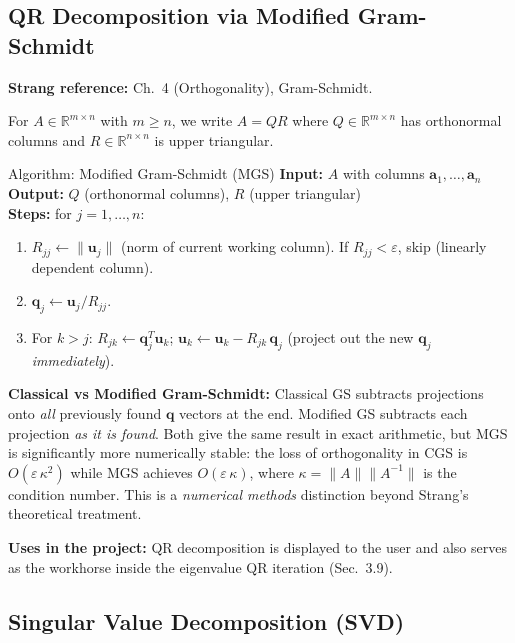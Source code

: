 \documentclass[12pt, a4paper]{article}
\newcommand{\R}{\mathbb{R}}
\begin{document}
\subsection{QR Decomposition via Modified Gram-Schmidt}

\textbf{Strang reference:} Ch.\ 4 (Orthogonality), Gram-Schmidt.

For $A \in \R^{m \times n}$ with $m \geq n$, we write $A = QR$ where
$Q \in \R^{m \times n}$ has orthonormal columns and $R \in \R^{n \times n}$
is upper triangular.

\begin{algobox}{Algorithm: Modified Gram-Schmidt (MGS)}
\textbf{Input:} $A$ with columns $\mathbf{a}_1, \ldots, \mathbf{a}_n$\\
\textbf{Output:} $Q$ (orthonormal columns), $R$ (upper triangular)\\
\textbf{Steps:} for $j = 1, \ldots, n$:
\begin{enumerate}[leftmargin=*, noitemsep]
  \item $R_{jj} \leftarrow \|\mathbf{u}_j\|$ (norm of current working column).
        If $R_{jj} < \varepsilon$, skip (linearly dependent column).
  \item $\mathbf{q}_j \leftarrow \mathbf{u}_j / R_{jj}$.
  \item For $k > j$: $R_{jk} \leftarrow \mathbf{q}_j^T \mathbf{u}_k$;
        $\mathbf{u}_k \leftarrow \mathbf{u}_k - R_{jk}\,\mathbf{q}_j$
        (project out the new $\mathbf{q}_j$ \emph{immediately}).
\end{enumerate}
\end{algobox}

\noindent
\textbf{Classical vs Modified Gram-Schmidt:} Classical GS subtracts
projections onto \emph{all} previously found $\mathbf{q}$ vectors at the end.
Modified GS subtracts each projection \emph{as it is found}.  Both give the
same result in exact arithmetic, but MGS is significantly more numerically
stable: the loss of orthogonality in CGS is $O(\varepsilon\,\kappa^2)$ while
MGS achieves $O(\varepsilon\,\kappa)$, where $\kappa = \|A\|\|A^{-1}\|$ is
the condition number.  This is a \emph{numerical methods} distinction beyond
Strang's theoretical treatment.

\medskip
\noindent
\textbf{Uses in the project:} QR decomposition is displayed to the user and
also serves as the workhorse inside the eigenvalue QR iteration (Sec.\ 3.9).

\subsection{Singular Value Decomposition (SVD)}
\end{document}
